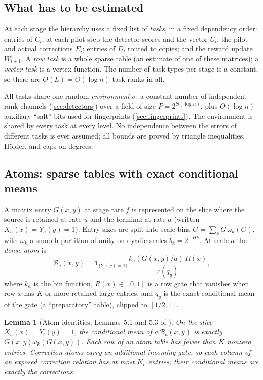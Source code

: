 \documentclass[11pt]{article}
\newtheorem{lemma}[theorem]{Lemma}
\theoremstyle{definition}
\theoremstyle{remark}
\newcommand{\one}{\mathbf 1}
\begin{document}
\subsection{What has to be estimated}\label{sec:env}

At each stage the hierarchy uses a fixed list of \emph{tasks}, in a fixed
dependency order: entries of $C_l$; at each pilot step the detector scores and the
vector $U_i$; the pilot and actual corrections $E_i$; entries of $D_l$ routed to
copies; and the reward update $W_{l+1}$. A \emph{row task} is a whole sparse table
(an estimate of one of these matrices); a \emph{vector task} is a vertex function.
The number of task types per stage is a constant, so there are $O(L)=O(\log n)$
task ranks in all.

All tasks share one random \emph{environment} $\sigma$: a constant number of
independent rank channels (\cref{sec:detectors}) over a field of size
$P=2^{\Theta(\log n)}$, plus $O(\log n)$ auxiliary ``salt'' bits used for
fingerprints (\cref{sec:fingerprints}). The environment is shared by every task at
every level. No independence between the errors of different tasks is ever
assumed; all bounds are proved by triangle inequalities, H\"older, and caps on
degrees.

\subsection{Atoms: sparse tables with exact conditional means}\label{sec:atoms}

A matrix entry $G(x,y)$ at stage rate $f$ is represented on the slice where the
source is retained at rate $u$ and the terminal at rate $a$ (written
$X_u(x)=Y_a(y)=1$). Entry sizes are split into scale bins
$G=\sum_kG\,\omega_k(G)$, with $\omega_k$ a smooth partition of unity on dyadic
scales $b_k=2^{-Hk}$. At scale $a$ the \emph{dense atom} is
\[
\mathcal B_a(x,y)=\one_{\{Y_t(y)=1\}}\frac{k_a(G(x,y)/a)\,R(x)}{c(q_y)},
\]
where $k_a$ is the bin function, $R(x)\in[0,1]$ is a row gate that vanishes when
row $x$ has $K$ or more retained large entries, and $q_y$ is the exact conditional
mean of the gate (a ``preparatory'' table), clipped to $[1/2,1]$.

\begin{lemma}[Atom identities; Lemmas~5.1 and 5.3 of \cite{OpenAI-BPL}]
On the slice $X_u(x)=Y_t(y)=1$, the conditional mean of $a\,\mathcal B_a(x,y)$ is
exactly $G(x,y)\omega_k(G(x,y))$. Each row of an atom table has fewer than $K$
nonzero entries. Correction atoms carry an additional incoming gate, so each
column of an exposed correction relation has at most $K_c$ entries; their
conditional means are exactly the corrections.
\end{lemma}
\end{document}
